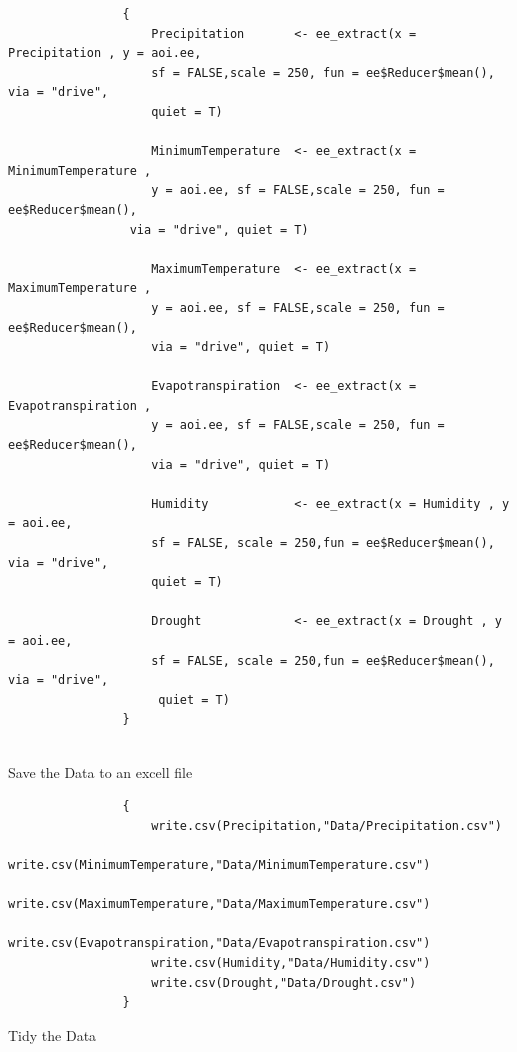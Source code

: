 \documentclass[12pt,a4paper]{book}
\begin{document}
        	\begin{verbatim}
        		{
        			Precipitation       <- ee_extract(x = Precipitation , y = aoi.ee,
        			sf = FALSE,scale = 250, fun = ee$Reducer$mean(), via = "drive",
        			quiet = T)
        			
        			MinimumTemperature  <- ee_extract(x = MinimumTemperature , 
        			y = aoi.ee, sf = FALSE,scale = 250, fun = ee$Reducer$mean(),
        		 via = "drive", quiet = T)
        			
        			MaximumTemperature  <- ee_extract(x = MaximumTemperature ,
        			y = aoi.ee, sf = FALSE,scale = 250, fun = ee$Reducer$mean(),
        			via = "drive", quiet = T)
        			
        			Evapotranspiration  <- ee_extract(x = Evapotranspiration ,
        			y = aoi.ee, sf = FALSE,scale = 250, fun = ee$Reducer$mean(),
        			via = "drive", quiet = T)
        			
        			Humidity            <- ee_extract(x = Humidity , y = aoi.ee,
        			sf = FALSE, scale = 250,fun = ee$Reducer$mean(), via = "drive",
        			quiet = T)
        			
        			Drought             <- ee_extract(x = Drought , y = aoi.ee, 
        			sf = FALSE, scale = 250,fun = ee$Reducer$mean(), via = "drive",
        			 quiet = T)
        		}
        		
        	\end{verbatim}
    Save the Data to an excell file 
			\begin{verbatim}
				{
					write.csv(Precipitation,"Data/Precipitation.csv")
					write.csv(MinimumTemperature,"Data/MinimumTemperature.csv")
					write.csv(MaximumTemperature,"Data/MaximumTemperature.csv")
					write.csv(Evapotranspiration,"Data/Evapotranspiration.csv")
					write.csv(Humidity,"Data/Humidity.csv")
					write.csv(Drought,"Data/Drought.csv")
				}
			\end{verbatim}
		Tidy the Data
\end{document}

